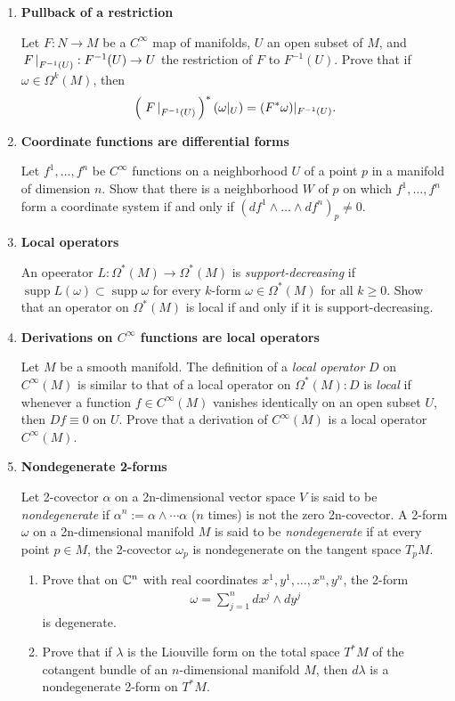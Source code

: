 \documentclass[12pt,a4paper]{report}
\newcommand{\SUPP}{\operatorname{supp}}
\begin{document}
\begin{enumerate}[label=19.\arabic*]
\item \textbf{Pullback of a restriction}

Let $F: N\to M$ be a $C^\infty$ map of manifolds, $U$ an open subset of $M$, and $\left . F \, \right |_{F^{-1}(U)} :F^{-1}(U) \to U$ the restriction of $F$ to $F^{-1}(U)$.  Prove that if $\omega\in\Omega^k(M)$, then
\begin{align*}
	\left (\, \left . F \, \right |_{F^{-1}(U)} \,\right )^*(\omega|_U) = (F^*\omega)|_{F^{-1}(U)}.
\end{align*}

\item \textbf{Coordinate functions are differential forms}

Let $f^1,\dots,f^n$ be $C^\infty$ functions on a neighborhood $U$ of a point $p$ in a manifold of dimension $n$.  Show that there is a neighborhood $W$ of $p$ on which $f^1,\dots,f^n$ form a coordinate system if and only if $(df^1\wedge\dots\wedge df^n)_p \ne 0$.

\item \textbf{Local operators}

An opeerator $L:\Omega^*(M) \to \Omega^*(M)$ is \textit{support-decreasing} if $\SUPP L(\omega) \subset \SUPP\omega$ for every $k$-form $\omega \in \Omega^*(M)$ for all $k \ge 0$.  Show that an operator on $\Omega^*(M)$ is local if and only if it is support-decreasing.

\item \textbf{Derivations on $C^\infty$ functions are local operators}

Let $M$ be a smooth manifold.  The definition of a \textit{local operator}  $D$ on $C^\infty(M)$ is similar to that of a local operator on $\Omega^*(M): D$ is \textit{local} if whenever a function $f \in C^\infty(M)$ vanishes identically on an open subset $U$, then $Df \equiv 0$ on $U$.  Prove that a derivation of $C^\infty(M)$ is a local operator $C^\infty(M)$.

\item \textbf{Nondegenerate 2-forms}

Let 2-covector $\alpha$ on a 2n-dimensional vector space $V$ is said to be \textit{nondegenerate} if $\alpha^n:= \alpha\wedge\cdots\alpha$ ($n$ times) is not the zero 2n-covector.  A 2-form $\omega$ on a 2n-dimensional manifold $M$ is said to be \textit{nondegenerate} if at every point $p\in  M$, the 2-covector $\omega_p$ is nondegenerate on the tangent space $T_pM$.
\begin{enumerate}[label=(\alph*)]

	\item Prove that on $\mathbb{C}^n$ with real coordinates $x^1,y^1,\dots,x^n,y^n$, the 2-form 
	\begin{align*}
		\omega = \sum_{j=1}^n dx^j\wedge dy^j
	\end{align*}is degenerate.
	\item Prove that if $\lambda$ is the Liouville form on the total space $T^*M$ of the cotangent bundle of an $n$-dimensional manifold $M$, then $d\lambda$ is a nondegenerate 2-form on $T^*M$.


\end{enumerate}
\end{enumerate}
\end{document}
